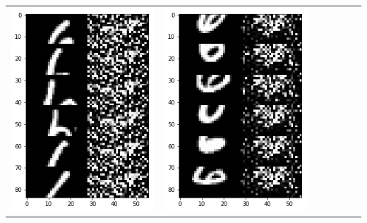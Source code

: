 \documentclass[12pt]{report} %
\begin{document}
\begin{tabular}{m{0.7cm}m{2.4cm}m{2.4cm}m{2.4cm}m{2.4cm}m{2.4cm}m{2.4cm}}
\includegraphics[scale=0.3]{pictures/M2_6_up.png} & \includegraphics[scale=0.3]{pictures/M2_6_down.png}\\

\end{tabular}
\end{document}
